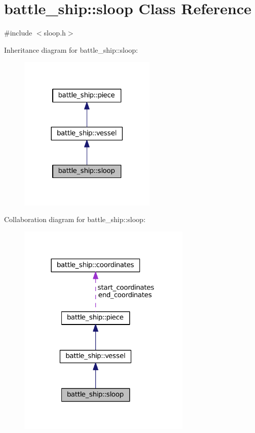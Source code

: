 \hypertarget{classbattle__ship_1_1sloop}{}\section{battle\+\_\+ship\+:\+:sloop Class Reference}
\label{classbattle__ship_1_1sloop}


{\ttfamily \#include $<$sloop.\+h$>$}



Inheritance diagram for battle\+\_\+ship\+:\+:sloop\+:
\nopagebreak
\begin{figure}[H]
\begin{center}
\leavevmode
\includegraphics[width=185pt]{classbattle__ship_1_1sloop__inherit__graph}
\end{center}
\end{figure}


Collaboration diagram for battle\+\_\+ship\+:\+:sloop\+:
\nopagebreak
\begin{figure}[H]
\begin{center}
\leavevmode
\includegraphics[width=234pt]{classbattle__ship_1_1sloop__coll__graph}
\end{center}
\end{figure}
